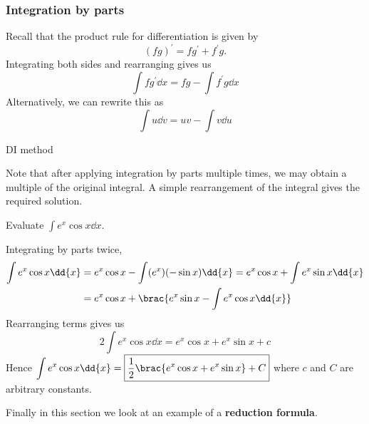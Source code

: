 \subsubsection{Integration by parts}
Recall that the product rule for differentiation is given by
\[ (fg)^\prime=fg^\prime+f^\prime g. \]
Integrating both sides and rearranging gives us
\begin{equation}
\int f g^\prime\dd{x} = fg - \int f^\prime g\dd{x}
\end{equation}
Alternatively, we can rewrite this as 
\begin{equation}
\int u \dd{v} = uv - \int v \dd{u}
\end{equation}

DI method

Note that after applying integration by parts multiple times, we may obtain a multiple of the original integral. A simple rearrangement of the integral gives the required solution.

\begin{exercise}{}{}
Evaluate $\int e^x\cos x\dd{x}$.
\end{exercise}
\begin{solution}
Integrating by parts twice,
\begin{align*}
\int e^x\cos x\dd{x}
&= e^x\cos x-\int(e^x)(-\sin x)\dd{x}=e^x\cos x+\int e^x\sin x\dd{x} \\
&= e^x\cos x+\brac{e^x\sin x-\int e^x\cos x\dd{x}}
\end{align*}
Rearranging terms gives us
\[ 2\int e^x\cos x\dd{x}=e^x\cos x+e^x\sin x+c \]
Hence $\displaystyle\int e^x\cos x\dd{x}=\boxed{\frac{1}{2}\brac{e^x\cos x+e^x\sin x}+C}$
where $c$ and $C$ are arbitrary constants.
\end{solution}

Finally in this section we look at an example of a \textbf{reduction formula}.

